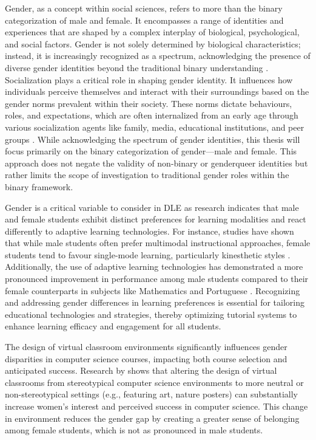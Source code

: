 Gender, as a concept within social sciences, refers to more than the binary categorization of male and female.
It encompasses a range of identities and experiences that are shaped by a complex interplay of biological, psychological, and social factors.
Gender is not solely determined by biological characteristics; instead, it is increasingly recognized as a spectrum, acknowledging the presence of diverse gender identities beyond the traditional binary understanding \parencite{lindqvistWhatGenderAnyway2021}.
Socialization plays a critical role in shaping gender identity. It influences how individuals perceive themselves and interact with their surroundings based on the gender norms prevalent within their society.
These norms dictate behaviours, roles, and expectations, which are often internalized from an early age through various socialization agents like family, media, educational institutions, and peer groups \parencite{kampshoffHandbuchGeschlechterforschungUnd2012}.
While acknowledging the spectrum of gender identities, this thesis will focus primarily on the binary categorization of gender—male and female.
This approach does not negate the validity of non-binary or genderqueer identities but rather limits the scope of investigation to traditional gender roles within the binary framework.

Gender is a critical variable to consider in DLE as research indicates that male and female students exhibit distinct preferences for learning modalities and react differently to adaptive learning technologies.
For instance, studies have shown that while male students often prefer multimodal instructional approaches, female students tend to favour single-mode learning, particularly kinesthetic styles \parencite{wehrweinGenderDifferencesLearning2007}.
Additionally, the use of adaptive learning technologies has demonstrated a more pronounced improvement in performance among male students compared to their female counterparts in subjects like Mathematics and Portuguese \parencite{desantanaEvaluatingImpactMars2016}.
Recognizing and addressing gender differences in learning preferences is essential for tailoring educational technologies and strategies, thereby optimizing tutorial systems to enhance learning efficacy and engagement for all students.

The design of virtual classroom environments significantly influences gender disparities in computer science courses, impacting both course selection and anticipated success.
Research by \textcite{cheryanClassroomsMatterDesign2011} shows that altering the design of virtual classrooms from stereotypical computer science environments  to more neutral or non-stereotypical settings (e.g., featuring art, nature posters) can substantially increase women's interest and perceived success in computer science.
This change in environment reduces the gender gap by creating a greater sense of belonging among female students, which is not as pronounced in male students.


